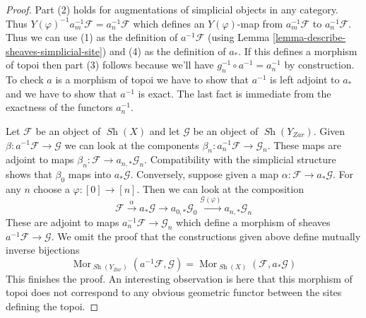 \documentclass{stacks-project}
\theoremstyle{plain}
\theoremstyle{definition}
\theoremstyle{remark}
\numberwithin{equation}{subsection}
\def\Mor{\mathop{\mathrm{Mor}}\nolimits}
\def\Sh{\mathop{\mathit{Sh}}\nolimits}
\begin{document}
\begin{proof}
Part (2) holds for augmentations of simplicial objects in any category.
Thus $Y(\varphi)^{-1} a_m^{-1} \mathcal{F} = a_n^{-1}\mathcal{F}$
which defines an $Y(\varphi)$-map from $a_m^{-1}\mathcal{F}$
to $a_n^{-1}\mathcal{F}$.
Thus we can use (1) as the definition of $a^{-1}\mathcal{F}$ (using
Lemma \ref{lemma-describe-sheaves-simplicial-site}) and
(4) as the definition of $a_*$. If this defines a morphism of topoi
then part (3) follows because we'll have $g_n^{-1} \circ a^{-1} = a_n^{-1}$
by construction. To check $a$ is a morphism of topoi we have to show
that $a^{-1}$ is left adjoint to $a_*$ and we have to show that
$a^{-1}$ is exact. The last fact is immediate from the exactness of
the functors $a_n^{-1}$.

\medskip\noindent
Let $\mathcal{F}$ be an object of $\Sh(X)$ and let $\mathcal{G}$
be an object of $\Sh(Y_{Zar})$. Given
$\beta : a^{-1}\mathcal{F} \to \mathcal{G}$ we can look at the
components $\beta_n : a_n^{-1}\mathcal{F} \to \mathcal{G}_n$.
These maps are adjoint to maps
$\beta_n : \mathcal{F} \to a_{n, *}\mathcal{G}_n$.
Compatibility with the simplicial structure shows that
$\beta_0$ maps into $a_*\mathcal{G}$.
Conversely, suppose given a map $\alpha : \mathcal{F} \to a_*\mathcal{G}$.
For any $n$ choose a $\varphi : [0] \to [n]$. Then we can look at
the composition
$$
\mathcal{F} \xrightarrow{\alpha} a_*\mathcal{G}
\to a_{0, *}\mathcal{G}_0 \xrightarrow{\mathcal{G}(\varphi)}
a_{n, *}\mathcal{G}_n
$$
These are adjoint to maps $a_n^{-1}\mathcal{F} \to \mathcal{G}_n$
which define a morphism of sheaves $a^{-1}\mathcal{F} \to \mathcal{G}$.
We omit the proof that the constructions given above define
mutually inverse bijections
$$
\Mor_{\Sh(Y_{Zar})}(a^{-1}\mathcal{F}, \mathcal{G}) =
\Mor_{\Sh(X)}(\mathcal{F}, a_*\mathcal{G})
$$
This finishes the proof. An interesting observation is here that
this morphism of topoi does not correspond to any obvious geometric
functor between the sites defining the topoi.
\end{proof}
\end{document}

